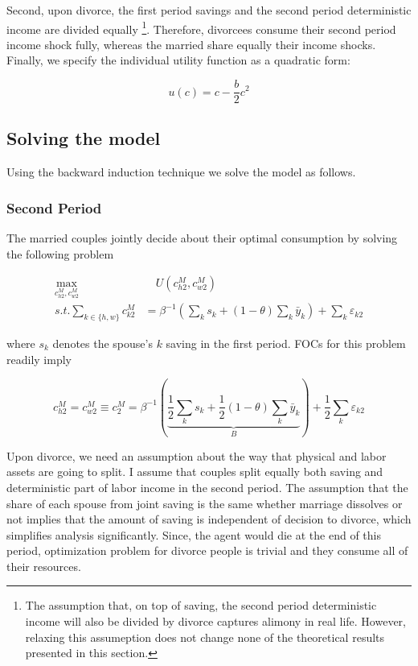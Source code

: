 Second, upon divorce, the first period savings and the second period deterministic income are divided equally \footnote{The assumption that, on top of saving, the second period deterministic income will also be divided by divorce captures alimony in real life. However, relaxing this assumeption does not change none of the theoretical results presented in this section.}. Therefore, divorcees consume their second period income shock fully, whereas the married share equally their income shocks. Finally, we specify the individual utility function as a quadratic form:

\begin{equation*}
u(c) = c - \dfrac{b}{2} c^2
\end{equation*}

\subsection{Solving the model}
Using the backward induction technique we solve the model as follows.

\subsubsection{Second Period}
The married couples jointly decide about their optimal consumption by solving the following problem 

\begin{align}
\max_{c_{h2}^M, c_{w2}^M} & \quad U(c^M_{h2}, c_{w2}^M) \nonumber \\
s.t. \sum_{k \in \{h,w\}} c_{k2}^M & = \beta^{-1} \left (\sum_k s_k + (1-\theta) \sum_k \bar y_k \right ) + \sum_k \varepsilon_{k2} \nonumber
\end{align}

\noindent where $s_k$ denotes the spouse's $k$ saving in the first period. FOCs for this problem readily imply

\begin{equation}
c_{h2}^M = c_{w2}^M \equiv c_{2}^M = \beta^{-1} \left ( \underbrace{\dfrac{1}{2} \sum_k s_k + \dfrac{1}{2} (1-\theta) \sum_k \bar y_k }_{B}\right ) + \dfrac{1}{2}\sum_k \varepsilon_{k2} 
\label{c2m}
\end{equation}

Upon divorce, we need an assumption about the way that physical and labor assets are going to split. I assume that couples split  equally both saving and deterministic part of labor income in the second period. The assumption that the share of each spouse from joint saving is the same whether marriage dissolves or not implies that the amount of saving is independent of decision to divorce, which simplifies analysis significantly.  Since, the agent would die at the end of this period, optimization problem for divorce people is trivial and they consume all of their resources. 

